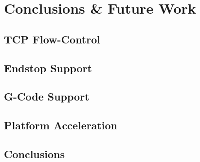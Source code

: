 \chapter{Conclusions \& Future Work}
	
	\section{TCP Flow-Control}
	
	\section{Endstop Support}
	
	\section{G-Code Support}
	
	\section{Platform Acceleration}
	
	\section{Conclusions}
